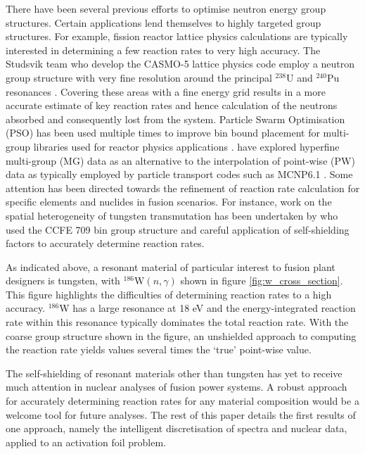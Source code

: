 There have been several previous efforts to optimise neutron energy group structures. Certain applications lend themselves to highly targeted group structures. For example, fission reactor lattice physics calculations are typically interested in determining a few reaction rates to very high accuracy. The Studsvik team who develop the CASMO-5 lattice physics code employ a neutron group structure with very fine resolution around the principal $^{238}\mathrm{U}$ and $^{240}\mathrm{Pu}$ resonances \cite{Rhodes2006}. Covering these areas with a fine energy grid results in a more accurate estimate of key reaction rates and hence calculation of the neutrons absorbed and consequently lost from the system. Particle Swarm Optimisation (PSO) has been used multiple times to improve bin bound placement for multi-group libraries used for reactor physics applications \cite{Yi2013}\cite{Akbari2012}\cite{Akbari2013}\cite{Fleming2016}. \citet{Morgan2013} have explored hyperfine multi-group (MG) data as an alternative to the interpolation of point-wise (PW) data as typically employed by particle transport codes such as MCNP6.1 \cite{goorley2012}. Some attention has been directed towards the refinement of reaction rate calculation for specific elements and nuclides in fusion scenarios. For instance, work on the spatial heterogeneity of tungsten transmutation has been undertaken by \citet{Gilbert2016} who used the CCFE 709 bin group structure and careful application of self-shielding factors to accurately determine reaction rates.

As indicated above, a resonant material of particular interest to fusion plant designers is tungsten, with $^{186}\mathrm{W}(n,\gamma)$ shown in figure \ref{fig:w_cross_section}. This figure highlights the difficulties of determining reaction rates to a high accuracy. $^{186}$W has a large resonance at 18 eV and the energy-integrated reaction rate within this resonance typically dominates the total reaction rate. With the coarse group structure shown in the figure, an unshielded approach to computing the reaction rate yields values several times the `true' point-wise value.

The self-shielding of resonant materials other than tungsten has yet to receive much attention in nuclear analyses of fusion power systems. A robust approach for accurately determining reaction rates for any material composition would be a welcome tool for future analyses. The rest of this paper details the first results of one approach, namely the intelligent discretisation of spectra and nuclear data, applied to an activation foil problem.

